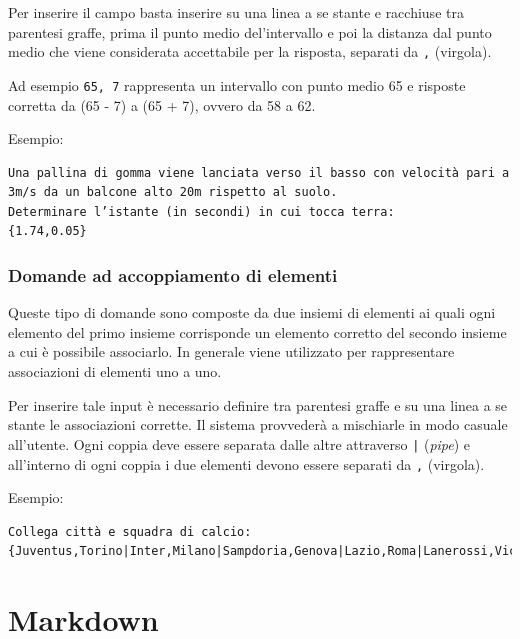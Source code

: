 \documentclass[12pt,a4paper]{article}
\begin{document}
\par Per inserire il campo basta inserire su una linea a se stante e racchiuse tra parentesi graffe, prima il punto medio del'intervallo e poi la distanza dal punto medio che viene considerata accettabile per la risposta, separati da \texttt{,} (virgola). \\

\par Ad esempio \texttt{{65, 7}} rappresenta un intervallo con punto medio 65 e risposte corretta da (65 - 7) a (65 + 7), ovvero da 58 a 62. \\

\par Esempio: \\
\begin{verbatim}
Una pallina di gomma viene lanciata verso il basso con velocità pari a 
3m/s da un balcone alto 20m rispetto al suolo. 
Determinare l’istante (in secondi) in cui tocca terra:
{1.74,0.05}
\end{verbatim}

\subsubsection{Domande ad accoppiamento di elementi}

\par Queste tipo di domande sono composte da due insiemi di elementi ai quali ogni elemento del primo insieme corrisponde un elemento corretto del secondo insieme a cui è possibile associarlo. In generale viene utilizzato per rappresentare associazioni di elementi uno a uno. \\

\par Per inserire tale input è necessario definire tra parentesi graffe e su una linea a se stante le associazioni corrette. Il sistema provvederà a mischiarle in modo casuale all'utente. Ogni coppia deve essere separata dalle altre attraverso \texttt{|} (\textit{pipe}) e all'interno di ogni coppia i due elementi devono essere separati da \texttt{,} (virgola). \\

\par Esempio: \\
\begin{verbatim}
Collega città e squadra di calcio:
{Juventus,Torino|Inter,Milano|Sampdoria,Genova|Lazio,Roma|Lanerossi,Vicenza}
\end{verbatim}

\section{Markdown}\label{markdownGuide}
\end{document}
